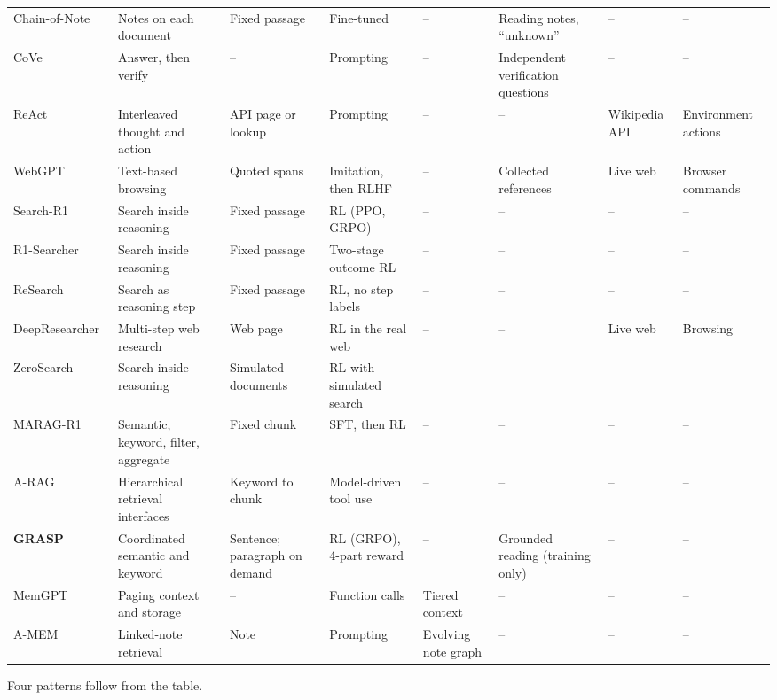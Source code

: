 \documentclass[pdflatex,sn-mathphys-num]{sn-jnl}%
\begin{document}
\begin{table}[t]
{\begin{tabular}{@{}L{2.8cm}L{3.1cm}L{2.1cm}L{2.2cm}L{1.7cm}L{2.4cm}L{1.6cm}L{1.6cm}@{}}
Chain-of-Note~\cite{yu2024chainofnote} & Notes on each document & Fixed passage & Fine-tuned & -- & Reading notes, ``unknown'' & -- & -- \\
CoVe~\cite{dhuliawala2024cove} & Answer, then verify & -- & Prompting & -- & Independent verification questions & -- & -- \\
ReAct~\cite{yao2023react} & Interleaved thought and action & API page or lookup & Prompting & -- & -- & Wikipedia API & Environment actions \\
WebGPT~\cite{nakano2021webgpt} & Text-based browsing & Quoted spans & Imitation, then RLHF & -- & Collected references & Live web & Browser commands \\
Search-R1~\cite{jin2025searchr1} & Search inside reasoning & Fixed passage & RL (PPO, GRPO) & -- & -- & -- & -- \\
R1-Searcher~\cite{song2025r1searcher} & Search inside reasoning & Fixed passage & Two-stage outcome RL & -- & -- & -- & -- \\
ReSearch~\cite{chen2025research} & Search as reasoning step & Fixed passage & RL, no step labels & -- & -- & -- & -- \\
DeepResearcher~\cite{zheng2025deepresearcher} & Multi-step web research & Web page & RL in the real web & -- & -- & Live web & Browsing \\
ZeroSearch~\cite{sun2025zerosearch} & Search inside reasoning & Simulated documents & RL with simulated search & -- & -- & -- & -- \\
MARAG-R1~\cite{luo2025maragr1} & Semantic, keyword, filter, aggregate & Fixed chunk & SFT, then RL & -- & -- & -- & -- \\
A-RAG~\cite{du2026arag} & Hierarchical retrieval interfaces & Keyword to chunk & Model-driven tool use & -- & -- & -- & -- \\
\textbf{GRASP}~\cite{gandhi2026grasp} & Coordinated semantic and keyword & Sentence; paragraph on demand & RL (GRPO), 4-part reward & -- & Grounded reading (training only) & -- & -- \\
MemGPT~\cite{packer2023memgpt} & Paging context and storage & -- & Function calls & Tiered context & -- & -- & -- \\
A-MEM~\cite{xu2025amem} & Linked-note retrieval & Note & Prompting & Evolving note graph & -- & -- & -- \\
\bottomrule
\end{tabular}%
}
\end{table}

Four patterns follow from the table.
\end{document}
